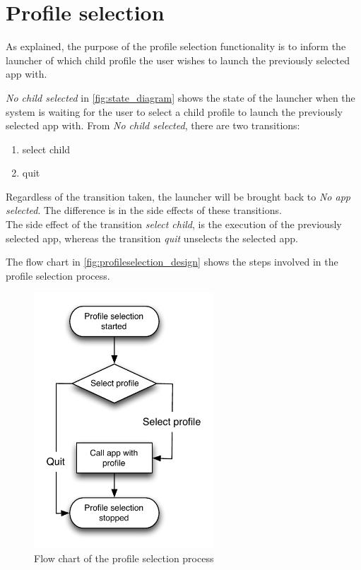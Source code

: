 \section{Profile selection}
\label{design:profile_selection}

As explained, the purpose of the profile selection functionality is to inform the launcher of which child profile the user wishes to launch the previously selected app with.

\emph{No child selected} in \autoref{fig:state_diagram} shows the state of the launcher when the system is waiting for the user to select a child profile to launch the previously selected app with.
From \emph{No child selected}, there are two transitions:

\begin{enumerate}
	\item select child
	\item quit
\end{enumerate}

\noindent Regardless of the transition taken, the launcher will be brought back to \emph{No app selected}.
The difference is in the side effects of these transitions. \\

\noindent The side effect of the transition \emph{select child}, is the execution of the previously selected app, whereas the transition \emph{quit} unselects the selected app.

The flow chart in \autoref{fig:profileselection_design} shows the steps involved in the profile selection process.

\begin{figure}[!h]
	\centering
	\includegraphics[width=0.6\textwidth]{gfx/profileselect_design.pdf}
	\caption{Flow chart of the profile selection process}
	\label{fig:profileselection_design}
\end{figure}


